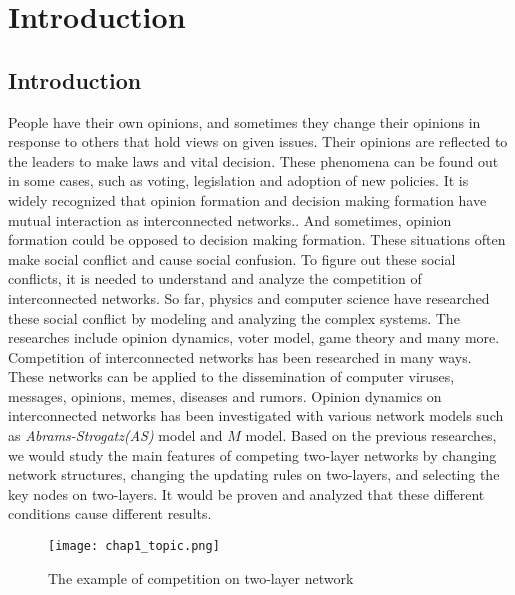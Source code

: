 
\chapter{Introduction}
\label{chap1}
\section{Introduction}
People have their own opinions, and sometimes they change their opinions in response to others that hold views on given issues. Their opinions are reflected to the leaders to make laws and vital decision. These phenomena can be found out in some cases, such as voting, legislation and adoption of new policies. It is widely recognized that opinion formation and decision making formation have mutual interaction as interconnected networks.\parencite{mikko2014, danziger2019, newman2010, boccaletti2014, domenico2013, tomasini2015, namkhanhvu2017}. And sometimes, opinion formation could be opposed to decision making formation. These situations often make social conflict and cause social confusion. To figure out these social conflicts, it is needed to understand and analyze the competition of interconnected networks. So far, physics and computer science have researched these social conflict by modeling and analyzing the complex systems\parencite{fangwu2004, zuev2012, laguna2004, masuda2014}. The researches include opinion dynamics, voter model, game theory and many more.\parencite{smyrnakis2019, bianconi2018, redner2017, haibo2017, amato2017, quattrociocchi2014, casey2009} 
Competition of interconnected networks has been researched in many ways. These networks can be applied to the dissemination of computer viruses, messages, opinions, memes, diseases and rumors\parencite{hua2014,shenyu2018, zhou2018, alvarez2016,gomez2015,diep2017,rocca2014,velasquez2018}. Opinion dynamics on interconnected networks has been investigated with various network models such as \textit{Abrams-Strogatz(AS)} model\parencite{abrams2003,vazquez2010} and $M$ model\parencite{rocca2014}.  Based on the previous researches, we would study the main features of competing two-layer networks by changing network structures, changing the updating rules on two-layers, and selecting the key nodes on two-layers. It would be proven and analyzed that these different conditions cause different results.
\begin{figure}[!htb]
	\centering
	\texttt{[image: chap1\_topic.png]}
	\caption{The example of competition on two-layer network}
	\label{chap1_topic}
\end{figure}

